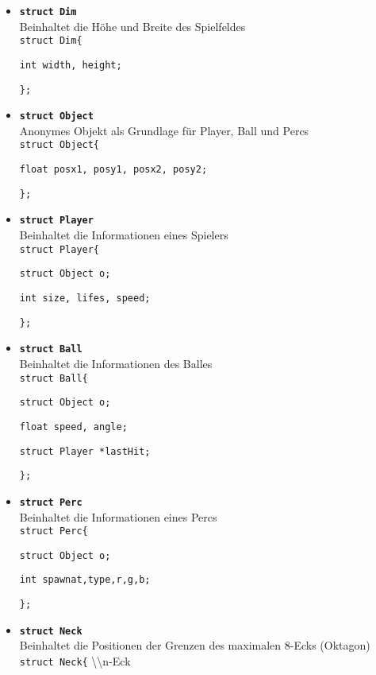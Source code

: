\documentclass[a4paper, 10pt]{article}
\begin{document}
\begin{itemize}
\item \texttt {{\bf struct Dim}}\\
Beinhaltet die Höhe und Breite des Spielfeldes\medskip\\
\texttt{struct Dim\{}

\quad\texttt{int width, height;}

\texttt{\};}\medskip

\item \texttt {{\bf struct Object}}\\
Anonymes Objekt als Grundlage für Player, Ball und Percs\medskip\\
\texttt{struct Object\{}

\quad \texttt{float posx1, posy1, posx2, posy2;}

\texttt{\};}\medskip

\item \texttt{{\bf struct Player}}\\
Beinhaltet die Informationen eines Spielers\medskip\\
\texttt{struct Player\{}

\quad \texttt{struct Object o;} 

\quad \texttt{int size, lifes, speed;}

\texttt{\};}\medskip

\item \texttt{{\bf struct Ball}}\\
Beinhaltet die Informationen des Balles\medskip\\
\texttt{struct Ball\{}

\quad \texttt{struct Object o;}

\quad \texttt{float speed, angle;}

\quad \texttt{struct Player *lastHit;}

\texttt{\};}

\item \texttt{{\bf struct Perc}}\\
Beinhaltet die Informationen eines Percs\medskip\\
 \texttt{struct Perc\{}

\quad \texttt{struct Object o;}

\quad \texttt{int spawnat,type,r,g,b;}

\texttt{\};}

\item \texttt{{\bf struct Neck}}\\
Beinhaltet die Positionen der Grenzen des maximalen 8-Ecks (Oktagon)\medskip\\
 \texttt{struct Neck\{} \quad \quad \quad \textbackslash\textbackslash n-Eck


\end{itemize}
\end{document}
